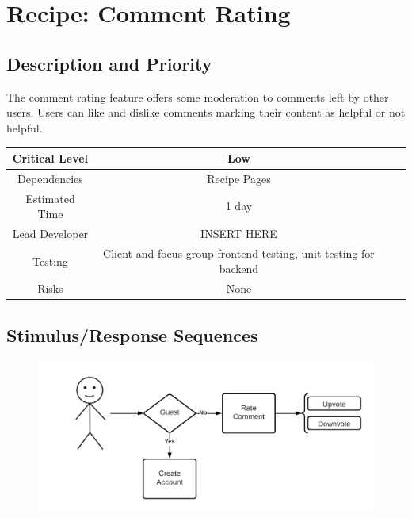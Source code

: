 \documentclass{scrreprt}
\begin{document}
\section{Recipe: Comment Rating}

\subsection{Description and Priority}

The comment rating feature offers some moderation to comments left by other users. Users can like and dislike comments marking their content as helpful or not helpful.

\begin{center}
    \begin{tabular}{| c | c | c | c |}
        \hline
        Critical Level & Low                                                               \\
        \hline
        Dependencies   & Recipe Pages                                                      \\
        \hline
        Estimated Time & 1 day                                                             \\
        \hline
        Lead Developer & INSERT HERE                                                   \\
        \hline
        Testing         & Client and focus group \gls{frontend} testing,
                          \gls{unit testing} for \gls{backend}                             \\
        \hline
        Risks          & None                                                              \\
        \hline
    \end{tabular}
\end{center}

\subsection{Stimulus/Response Sequences}

\begin{figure}[H]\centering
    \includegraphics[width=\columnwidth]{FlowCharts/Recipe-Comment-Rating.png}
\end{figure}
\end{document}
